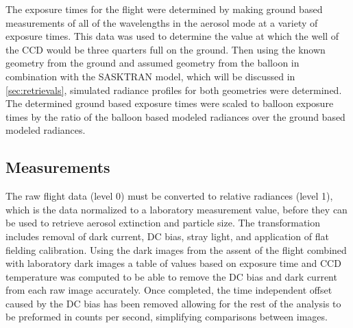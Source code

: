 \documentclass[12pt]{article}
\begin{document}
The exposure times for the flight were determined by making ground based measurements of all of the wavelengths in the aerosol mode at a variety of exposure times. This data was used to determine the value at which the well of the CCD would be three quarters full on the ground. Then using the known geometry from the ground and assumed geometry from the balloon in combination with the SASKTRAN model, which will be discussed in \autoref{sec:retrievals}, simulated radiance profiles for both geometries were determined. The determined ground based exposure times were scaled to balloon exposure times by the ratio of the balloon based modeled radiances over the ground based modeled radiances. %

\subsection{Measurements}

The raw flight data (level 0) must be converted to relative radiances (level 1), which is the data normalized to a laboratory measurement value, before they can be used to retrieve aerosol extinction and particle size. The transformation includes removal of dark current, DC bias, stray light, and application of flat fielding calibration. Using the dark images from the assent of the flight combined with laboratory dark images a table of values based on exposure time and CCD temperature was computed to be able to remove the DC bias and dark current from each raw image accurately. Once completed, the time independent offset caused by the DC bias has been removed allowing for the rest of the analysis to be preformed in counts per second, simplifying comparisons between images. %
\end{document}

